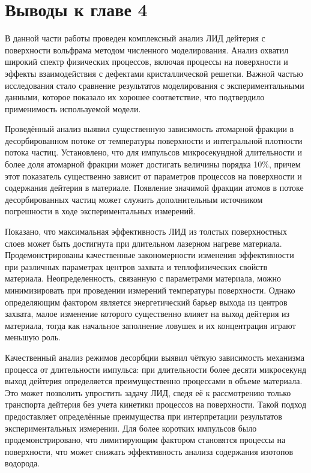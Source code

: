\section{Выводы к главе 4}

В данной части работы проведен комплексный анализ ЛИД дейтерия с поверхности вольфрама методом численного моделирования. Анализ охватил широкий спектр физических процессов, включая процессы на поверхности и эффекты взаимодействия с дефектами кристаллической решетки. Важной частью исследования стало сравнение результатов моделирования с экспериментальными данными, которое показало их хорошее соответствие, что подтвердило применимость используемой модели.

Проведённый анализ выявил существенную зависимость атомарной фракции в десорбированном потоке от температуры поверхности и интегральной плотности потока частиц. Установлено, что для импульсов микросекундной длительности и более доля атомарной фракции может достигать величины порядка 10\%, причем этот показатель существенно зависит от параметров процессов на поверхности и содержания дейтерия в материале. Появление значимой фракции атомов в потоке десорбированных частиц может служить дополнительным источником погрешности в ходе экспериментальных измерений.

Показано, что максимальная эффективность ЛИД из толстых поверхностных слоев может быть достигнута при длительном лазерном нагреве материала. Продемонстрированы качественные закономерности изменения эффективности при различных параметрах центров захвата и теплофизических свойств материала. Неопределенность, связанную с параметрами материала, можно минимизировать при проведении измерений температуры поверхности. Однако определяющим фактором является энергетический барьер выхода из центров захвата, малое изменение которого существенно влияет на выход дейтерия из материала, тогда как начальное заполнение ловушек и их концентрация играют меньшую роль. 

Качественный анализ режимов десорбции выявил чёткую зависимость механизма процесса от длительности импульса: при длительности более десяти микросекунд выход дейтерия определяется преимущественно процессами в объеме материала. Это может позволить упростить задачу ЛИД, сведя её к рассмотрению только транспорта дейтерия без учета кинетики процессов на поверхности. Такой подход предоставляет определённые преимущества при интерпретации результатов экспериментальных измерении. Для более коротких импульсов было продемонстрировано, что лимитирующим фактором становятся процессы на поверхности, что может снижать эффективность анализа содержания изотопов водорода.


\clearpage
